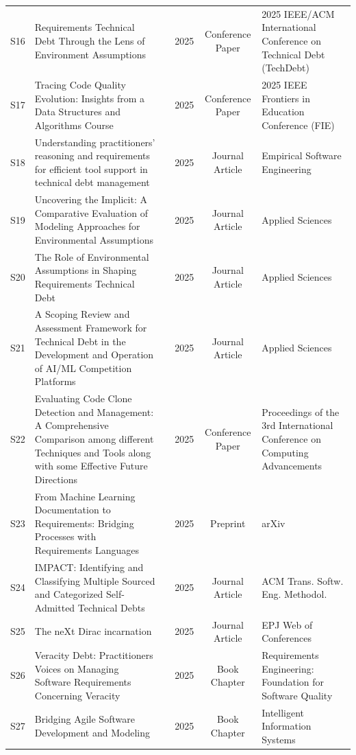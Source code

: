 \documentclass[12pt,reqno, twoside]{amsbook}
\theoremstyle{plain}
\numberwithin{equation}{chapter}
\numberwithin{section}{chapter}
\begin{document}
\begin{landscape}
\begin{center}
\begin{longtable}{|c|p{5cm}|p{4.5cm}|c|c|p{5.5cm}|}
S16 & Requirements Technical Debt Through the Lens of Environment Assumptions & \citeauthor{Alenazi2025} & 2025 & Conference Paper & 2025 IEEE/ACM International Conference on Technical Debt (TechDebt) \\
S17 & Tracing Code Quality Evolution: Insights from a Data Structures and Algorithms Course & \citeauthor{Prajapati2025} & 2025 & Conference Paper & 2025 IEEE Frontiers in Education Conference (FIE) \\
S18 & Understanding practitioners’ reasoning and requirements for efficient tool support in technical debt management & \citeauthor{Biazotto2025} & 2025 & Journal Article & Empirical Software Engineering \\
S19 & Uncovering the Implicit: A Comparative Evaluation of Modeling Approaches for Environmental Assumptions & \citeauthor{Alenazi2025b} & 2025 & Journal Article & Applied Sciences \\
S20 & The Role of Environmental Assumptions in Shaping Requirements Technical Debt & \citeauthor{Alenazi2025c} & 2025 & Journal Article & Applied Sciences \\
S21 & A Scoping Review and Assessment Framework for Technical Debt in the Development and Operation of {AI}/{ML} Competition Platforms & \citeauthor{Sklavenitis2025} & 2025 & Journal Article & Applied Sciences \\
S22 & Evaluating Code Clone Detection and Management: A Comprehensive Comparison among different Techniques and Tools along with some Effective Future Directions & \citeauthor{Sneha2025} & 2025 & Conference Paper & Proceedings of the 3rd International Conference on Computing Advancements \\
S23 & From Machine Learning Documentation to Requirements: Bridging Processes with Requirements Languages & \citeauthor{Peng2025} & 2025 & Preprint & arXiv \\
S24 & {IMPACT}: Identifying and Classifying Multiple Sourced and Categorized Self-Admitted Technical Debts & \citeauthor{Li2025} & 2025 & Journal Article & ACM Trans. Softw. Eng. Methodol. \\
S25 & The {neXt} Dirac incarnation & \citeauthor{Stagni2025} & 2025 & Journal Article & EPJ Web of Conferences \\
S26 & Veracity Debt: Practitioners Voices on Managing Software Requirements Concerning Veracity & \citeauthor{Perera2025} & 2025 & Book Chapter & Requirements Engineering: Foundation for Software Quality \\
S27 & Bridging Agile Software Development and Modeling & \citeauthor{Granados-Hondares2025} & 2025 & Book Chapter & Intelligent Information Systems \\


\end{longtable}
\end{center}
\end{landscape}
\end{document}
